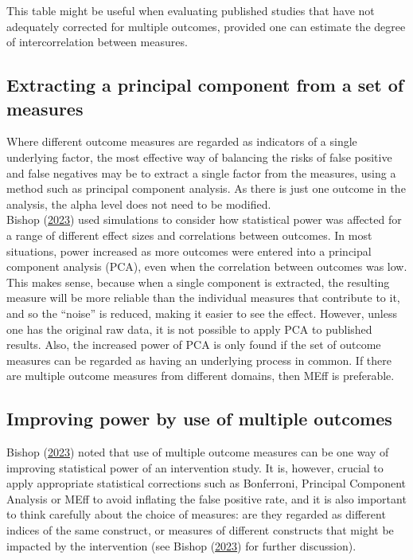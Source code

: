 \documentclass{krantz}
\begin{document}
This table might be useful when evaluating published studies that have not adequately corrected for multiple outcomes, provided one can estimate the degree of intercorrelation between measures.

\hypertarget{extracting-a-principal-component-from-a-set-of-measures}{%
\subsection{Extracting a principal component from a set of measures}\label{extracting-a-principal-component-from-a-set-of-measures}}

Where different outcome measures are regarded as indicators of a single underlying factor, the most effective way of balancing the risks of false positive and false negatives may be to extract a single factor from the measures, using a method such as principal component analysis. As there is just one outcome in the analysis, the alpha level does not need to be modified.\\
Bishop (\protect\hyperlink{ref-bishop2023b}{2023}) used simulations to consider how statistical power was affected for a range of different effect sizes and correlations between outcomes. In most situations, power increased as more outcomes were entered into a principal component analysis (PCA), even when the correlation between outcomes was low. This makes sense, because when a single component is extracted, the resulting measure will be more reliable than the individual measures that contribute to it, and so the ``noise'' is reduced, making it easier to see the effect. However, unless one has the original raw data, it is not possible to apply PCA to published results. Also, the increased power of PCA is only found if the set of outcome measures can be regarded as having an underlying process in common. If there are multiple outcome measures from different domains, then MEff is preferable.

\hypertarget{improving-power-by-use-of-multiple-outcomes}{%
\subsection{Improving power by use of multiple outcomes}\label{improving-power-by-use-of-multiple-outcomes}}

Bishop (\protect\hyperlink{ref-bishop2023b}{2023}) noted that use of multiple outcome measures can be one way of improving statistical power of an intervention study. It is, however, crucial to apply appropriate statistical corrections such as Bonferroni, Principal Component Analysis or MEff to avoid inflating the false positive rate, and it is also important to think carefully about the choice of measures: are they regarded as different indices of the same construct, or measures of different constructs that might be impacted by the intervention (see Bishop (\protect\hyperlink{ref-bishop2023b}{2023}) for further discussion).
\end{document}
